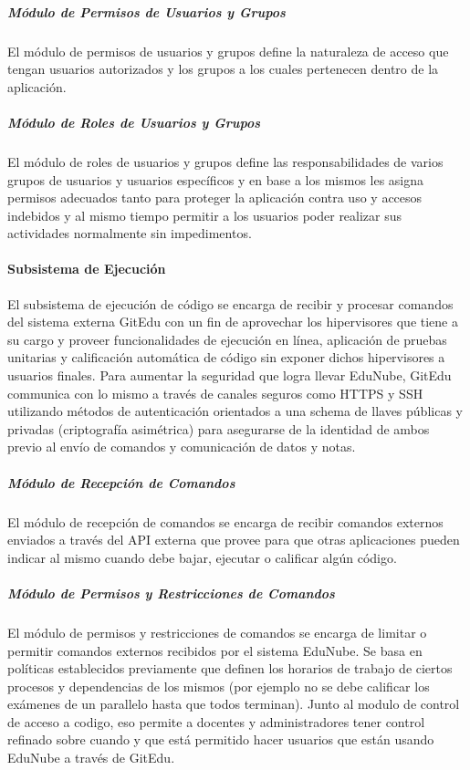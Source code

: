 \subparagraph{Módulo de Permisos de Usuarios y Grupos}
El módulo de permisos de usuarios y grupos define la naturaleza de acceso que tengan usuarios autorizados y los grupos a los cuales pertenecen dentro de la aplicación.

\subparagraph{Módulo de Roles de Usuarios y Grupos}
El módulo de roles de usuarios y grupos define las responsabilidades de varios grupos de usuarios y usuarios específicos y en base a los mismos les asigna permisos adecuados tanto para proteger la aplicación contra uso y accesos indebidos y al mismo tiempo permitir a los usuarios poder realizar sus actividades normalmente sin impedimentos.

\paragraph{Subsistema de Ejecución}
El subsistema de ejecución de código se encarga de recibir y procesar  comandos del sistema externa GitEdu con un fin de aprovechar los hipervisores que tiene a su cargo y proveer funcionalidades de ejecución en línea, aplicación de pruebas unitarias y calificación automática de código sin exponer dichos hipervisores a usuarios finales. Para aumentar la seguridad que logra llevar EduNube, GitEdu communica con lo mismo a través de canales seguros como HTTPS y SSH utilizando métodos de autenticación orientados a una schema de llaves públicas y privadas (criptografía asimétrica) para asegurarse de la identidad de ambos previo al envío de comandos y comunicación de datos y notas.

\subparagraph{Módulo de Recepción de Comandos}
El módulo de recepción de comandos se encarga de recibir comandos externos enviados a través del API externa que provee para que otras aplicaciones pueden indicar al mismo cuando debe bajar, ejecutar o calificar algún código.

\subparagraph{Módulo de Permisos y Restricciones de Comandos}
El módulo de permisos y restricciones de comandos se encarga de limitar o permitir comandos externos recibidos por el sistema EduNube. Se basa en políticas establecidos previamente que definen los horarios de trabajo de ciertos procesos y dependencias de los mismos (por ejemplo no se debe calificar los exámenes de un parallelo hasta que todos terminan). Junto al modulo de control de acceso a codigo, eso permite a docentes y administradores tener control refinado sobre cuando y que está permitido hacer usuarios que están usando EduNube a través de GitEdu.

